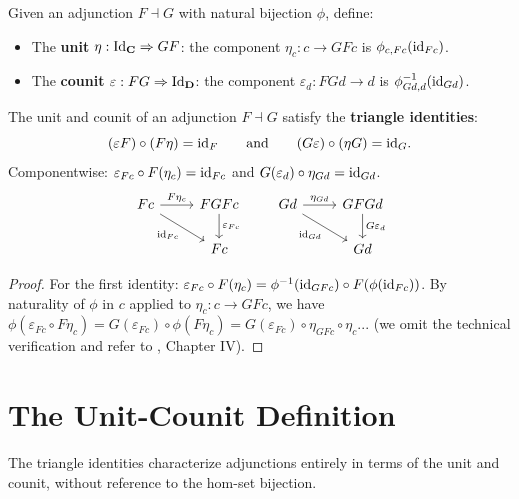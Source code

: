 \begin{definition}
Given an adjunction $F \dashv G$ with natural bijection $\phi$, define:
\begin{itemize}
  \item The \textbf{unit} $\eta: \mathrm{Id}_{\mathbf{C}} \Rightarrow GF$: the component $\eta_c: c \to GFc$ is $\phi_{c,Fc}(\mathrm{id}_{Fc})$.
  \item The \textbf{counit} $\varepsilon: FG \Rightarrow \mathrm{Id}_{\mathbf{D}}$: the component $\varepsilon_d: FGd \to d$ is $\phi^{-1}_{Gd,d}(\mathrm{id}_{Gd})$.
\end{itemize}
\end{definition}

\begin{theorem}
\label{thm:triangle-identities}
The unit and counit of an adjunction $F \dashv G$ satisfy the \textbf{triangle identities}:
\[
  (\varepsilon F) \circ (F\eta) = \mathrm{id}_F \qquad \text{and} \qquad (G\varepsilon) \circ (\eta G) = \mathrm{id}_G.
\]
Componentwise: $\varepsilon_{Fc} \circ F(\eta_c) = \mathrm{id}_{Fc}$ and $G(\varepsilon_d) \circ \eta_{Gd} = \mathrm{id}_{Gd}$.
\[
  \begin{tikzcd}
    Fc \arrow[r, "F\eta_c"] \arrow[dr, "\id_{Fc}"'] & FGFc \arrow[d, "\varepsilon_{Fc}"] \\
    & Fc
  \end{tikzcd}
  \qquad
  \begin{tikzcd}
    Gd \arrow[r, "\eta_{Gd}"] \arrow[dr, "\id_{Gd}"'] & GFGd \arrow[d, "G\varepsilon_d"] \\
    & Gd
  \end{tikzcd}
\]
\end{theorem}

\begin{proof}
For the first identity: $\varepsilon_{Fc} \circ F(\eta_c) = \phi^{-1}(\mathrm{id}_{GFc}) \circ F(\phi(\mathrm{id}_{Fc}))$. By naturality of $\phi$ in $c$ applied to $\eta_c: c \to GFc$, we have $\phi(\varepsilon_{Fc} \circ F\eta_c) = G(\varepsilon_{Fc}) \circ \phi(F\eta_c) = G(\varepsilon_{Fc}) \circ \eta_{GFc} \circ \eta_c$... (we omit the technical verification and refer to \cite{MacLane1998}, Chapter IV).
\end{proof}

\section{The Unit-Counit Definition}

The triangle identities characterize adjunctions entirely in terms of the unit and counit, without reference to the hom-set bijection.

